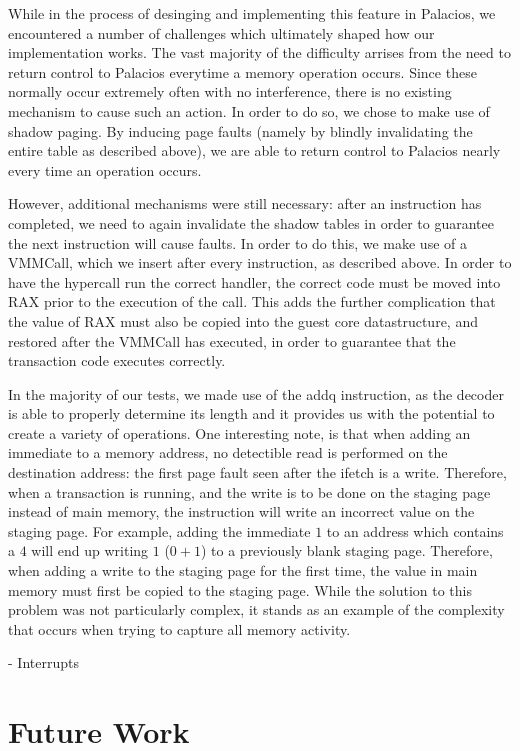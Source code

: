 \documentclass{acm_proc_article-sp}
\begin{document}
While in the process of desinging and implementing this feature in Palacios, we
encountered a number of challenges which ultimately shaped how our implementation
works. The vast majority of the difficulty arrises from the need to return
control to Palacios everytime a memory operation occurs. Since these normally
occur extremely often with no interference, there is no existing mechanism to 
cause such an action. In order to do so, we chose to make use of shadow paging.
By inducing page faults (namely by blindly invalidating the entire table as
described above), we are able to return control to Palacios nearly every time
an operation occurs.

However, additional mechanisms were still necessary: after an instruction has
completed, we need to again invalidate the shadow tables in order to guarantee 
the next instruction will cause faults. In order to do this, we make use of a 
VMMCall, which we insert after every instruction, as described above. In order
to have the hypercall run the correct handler, the correct code must be moved
into RAX prior to the execution of the call. This adds the further complication
that the value of RAX must also be copied into the guest core datastructure,
and restored after the VMMCall has executed, in order to guarantee that the 
transaction code executes correctly.  

In the majority of our tests, we made use of the addq instruction, as the 
decoder is able to properly determine its length and it provides us with the
potential to create a variety of operations. One interesting note, is that when
adding an immediate to a memory address, no detectible read is performed on
the destination address: the first page fault seen after the ifetch is a write.
Therefore, when a transaction is running, and the write is to be done on the
staging page instead of main memory, the instruction will write an incorrect
value on the staging page. For example, adding the immediate $1$ to an address
which contains a $4$ will end up writing $1$ ($0+1$) to a previously blank
staging page. Therefore, when adding a write to the staging page for the first
time, the value in main memory must first be copied to the staging page. While
the solution to this problem was not particularly complex, it stands as an 
example of the complexity that occurs when trying to capture all memory 
activity.
 
- Interrupts

\section{Future Work}
\end{document}
